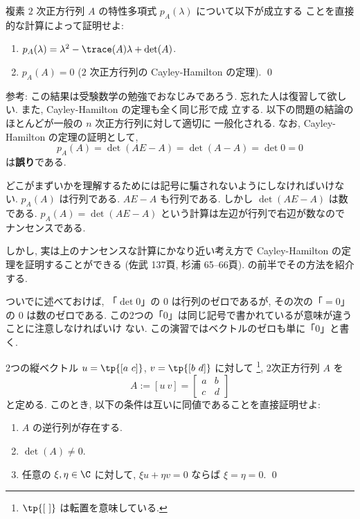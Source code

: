 \documentclass[12pt,twoside]{jarticle}
\begin{document}

\begin{question}\label{q:char-poly-2.1}
  複素 $2$ 次正方行列 $A$ の特性多項式 $p_A(\lambda)$ について以下が成立する
  ことを直接的な計算によって証明せよ: 
  \begin{enumerate}
  \item[(1)] \( p_A(\lambda) = \lambda^2 - \trace(A)\lambda + \det(A) \).
  \item[(2)] \( p_A(A) = 0 \) \quad ($2$ 次正方行列の Cayley-Hamilton の定理).
  \qed
  \end{enumerate}
\end{question}

\noindent 
参考: この結果は受験数学の勉強でおなじみであろう.
忘れた人は復習して欲しい.  また, Cayley-Hamilton の定理も全く同じ形で成
立する. 以下の問題の結論のほとんどが一般の $n$ 次正方行列に対して適切に
一般化される. なお, Cayley-Hamilton の定理の証明として,
\begin{equation*}
 p_A(A) = \det(AE - A) = \det(A - A) = \det 0 = 0
\end{equation*}
は{\bf 誤り}である. 

どこがまずいかを理解するためには記号に騙されないようにしなければいけない.
$p_A(A)$ は行列である.  $AE - A$ も行列である.  
しかし $\det(AE-A)$ は数である.  
$p_A(A)=\det(AE-A)$ という計算は左辺が行列で右辺が数なのでナンセンスである.

しかし, 実は上のナンセンスな計算にかなり近い考え方で 
Cayley-Hamilton の定理を証明することができる
(佐武 \cite{satake} 137頁, 杉浦 \cite{sugiura} 65--66頁).
 の前半でその方法を紹介する.

ついでに述べておけば, 「$\det 0$」の $0$ は行列のゼロであるが, 
その次の「$= 0$」の $0$ は数のゼロである.
この2つの「$0$」は同じ記号で書かれているが意味が違うことに注意しなければいけ
ない.  この演習ではベクトルのゼロも単に「$0$」と書く.


\begin{question}
  2つの縦ベクトル %
  $u=\tp{[a\ c]}$, $v=\tp{[b\ d]}$ に対して%
  \footnote{$\tp{[\ ]}$ は転置を意味している.}, 2次正方行列 $A$ を
  \begin{equation*}
    A := [u\ v] = \begin{bmatrix} a & b \\ c & d \end{bmatrix}
  \end{equation*}
  と定める. このとき, 以下の条件は互いに同値であることを直接証明せよ:
  \begin{enumerate}
  \item[(a)] $A$ の逆行列が存在する.
  \item[(b)] $\det(A) \ne 0$.
  \item[(c)] 任意の $\xi,\eta\in\C$ に対して, %
    $\xi u + \eta v = 0$ ならば $\xi = \eta = 0$.
  \qed
  \end{enumerate}
\end{question}
\end{document}
